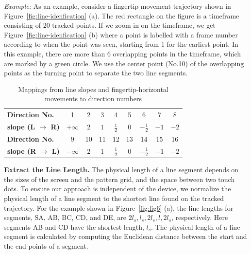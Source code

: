         \noindent \emph{Example:} As an example, consider a fingertip movement trajectory shown in
        Figure~\ref{fig:line-idenfication} (a). The red rectangle on the
        figure is a timeframe consisting of 20 tracked points.  If we zoom in
        on the timeframe, we get Figure~\ref{fig:line-idenfication} (b) where
        a point is labelled with a frame number according to when
        the point was seen, starting from 1 for the earliest point. In this example, there are more than 6
        overlapping points in the timeframe, which are marked by a green
        circle. We use the center
        point (No.10) of the overlapping points as the turning point to separate the two line segments.

        \begin{table}[t]
            \centering
            \caption{Mappings from line slopes and fingertip-horizontal movements to direction numbers}
            \label{tab:slopes}
            \small
            \begin{tabular}{lcccccccc}
                \toprule
                \textbf{Direction No.}& 1 & 2 & 3 & 4 & 5 & 6 & 7 & 8 \\
                \textbf{slope (L $\rightarrow$ R)} & $+\infty$ & $2$ & $1$ & $\frac{1}{2}$ & $0$ & $-\frac{1}{2}$ & $-1$ & $-2$ \\
                \midrule
                \textbf{Direction No.}& 9 & 10 & 11 & 12 & 13 & 14 & 15 & 16 \\
                \textbf{slope (R $\rightarrow$ L)} & $-\infty$ & $2$ & $1$ & $\frac{1}{2}$ & $0$ & $-\frac{1}{2}$ & $-1$ & $-2$ \\
                \bottomrule
            \end{tabular}
            \vspace{-2mm}
        \end{table}

        \vspace{2mm}
        \noindent \textbf{Extract the Line Length.}
        The physical length of a line segment depends
        on the sizes of the screen and the pattern grid, and the space between two touch dots.
        To ensure our approach is independent of the device, we normalize the physical length of a line segment to the
        shortest line found on the tracked trajectory. For the
        example shown in Figure~\ref{fig:fig6} (a), the line lengths for segments, SA, AB, BC, CD, and DE, are $2l_{s},l_{s},2l_{s},l,2l_{s}$, respectively.
        Here segments AB and CD have the shortest length, $l_s$. The physical length of a line segment is calculated by computing the
        Euclidean distance between the start and the end points of a segment.

